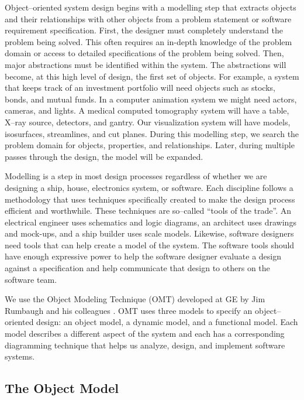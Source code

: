 Object--oriented system design begins with a modelling step that extracts objects and their relationships with other objects from a problem statement or software requirement specification. First, the designer must completely understand the problem being solved. This often requires an in-depth knowledge of the problem domain or access to detailed specifications of the problem being solved. Then, major abstractions must be identified within the system. The abstractions will become, at this high level of design, the first set of objects. For example, a system that keeps track of an investment portfolio will need objects such as stocks, bonds, and mutual funds. In a computer animation system we might need actors, cameras, and lights. A medical computed tomography system will have a table, X--ray source, detectors, and gantry. Our visualization system will have models, isosurfaces, streamlines, and cut planes. During this modelling step, we search the problem domain for objects, properties, and relationships. Later, during multiple passes through the design, the model will be expanded.

Modelling is a step in most design processes regardless of whether we are designing a ship, house, electronics system, or software. Each discipline follows a methodology that uses techniques specifically created to make the design process efficient and worthwhile. These techniques are so--called ``tools of the trade''. An electrical engineer uses schematics and logic diagrams, an architect uses drawings and mock-ups, and a ship builder uses scale models. Likewise, software designers need tools that can help create a model of the system. The software tools should have enough expressive power to help the software designer evaluate a design against a specification and help communicate that design to others on the software team.

We use the Object Modeling Technique (OMT) developed at GE by Jim Rumbaugh and his colleagues \cite{Rumbaugh91}. OMT uses three models to specify an object--oriented design: an object model, a dynamic model, and a functional model. Each model describes a different aspect of the system and each has a corresponding diagramming technique that helps us analyze, design, and implement software systems.

\subsection{The Object Model}


